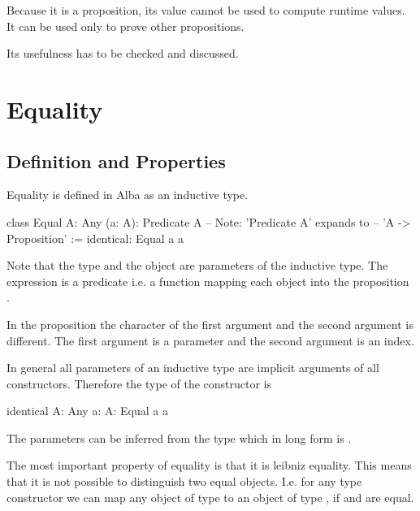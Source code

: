 Because it is a proposition, its value cannot be used to compute runtime values.
It can be used only to prove other propositions.

Its usefulness has to be checked and discussed.








\section{Equality}



\subsection{Definition and Properties}

Equality is defined in Alba as an inductive type.
\begin{alba}
    class
        Equal {A: Any} (a: A): Predicate A
            -- Note: 'Predicate A' expands to
            --       'A -> Proposition'
    :=
        identical: Equal a a
\end{alba}

Note that the type  and the object  are parameters of the
inductive type. The expression  is a predicate i.e. a function
 mapping each object  into the
proposition .

In the proposition  the character of the first argument 
and the second argument  is different. The first argument is a parameter
and the second argument is an index.

In general all parameters of an inductive type are implicit arguments of all
constructors. Therefore the type of the constructor  is
%
\begin{alba}
    identical {A: Any} {a: A}: Equal a a
\end{alba}
%
The parameters can be inferred from the type  which in long form
is .


The most important property of equality is that it is leibniz equality. This
means that it is not possible to distinguish two equal objects. I.e. for any
type constructor  we can map any object of type  to
an object of type , if  and  are equal.

